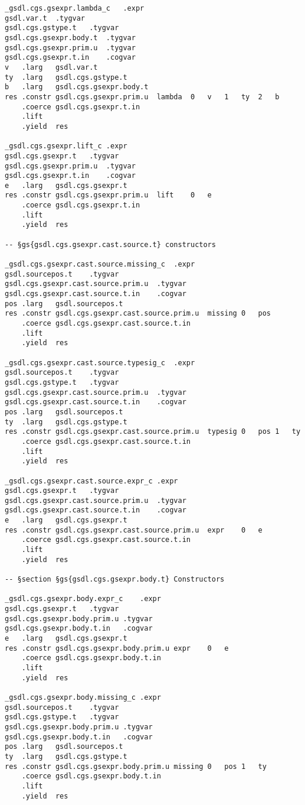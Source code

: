 \documentclass{report}
\begin{document}
\begin{verbatim}
_gsdl.cgs.gsexpr.lambda_c	.expr
gsdl.var.t	.tygvar
gsdl.cgs.gstype.t	.tygvar
gsdl.cgs.gsexpr.body.t	.tygvar
gsdl.cgs.gsexpr.prim.u	.tygvar
gsdl.cgs.gsexpr.t.in	.cogvar
v	.larg	gsdl.var.t
ty	.larg	gsdl.cgs.gstype.t
b	.larg	gsdl.cgs.gsexpr.body.t
res	.constr	gsdl.cgs.gsexpr.prim.u	lambda	0	v	1	ty	2	b
	.coerce	gsdl.cgs.gsexpr.t.in
	.lift
	.yield	res

_gsdl.cgs.gsexpr.lift_c	.expr
gsdl.cgs.gsexpr.t	.tygvar
gsdl.cgs.gsexpr.prim.u	.tygvar
gsdl.cgs.gsexpr.t.in	.cogvar
e	.larg	gsdl.cgs.gsexpr.t
res	.constr	gsdl.cgs.gsexpr.prim.u	lift	0	e
	.coerce	gsdl.cgs.gsexpr.t.in
	.lift
	.yield	res

-- §gs{gsdl.cgs.gsexpr.cast.source.t} constructors

_gsdl.cgs.gsexpr.cast.source.missing_c	.expr
gsdl.sourcepos.t	.tygvar
gsdl.cgs.gsexpr.cast.source.prim.u	.tygvar
gsdl.cgs.gsexpr.cast.source.t.in	.cogvar
pos	.larg	gsdl.sourcepos.t
res	.constr	gsdl.cgs.gsexpr.cast.source.prim.u	missing	0	pos
	.coerce	gsdl.cgs.gsexpr.cast.source.t.in
	.lift
	.yield	res

_gsdl.cgs.gsexpr.cast.source.typesig_c	.expr
gsdl.sourcepos.t	.tygvar
gsdl.cgs.gstype.t	.tygvar
gsdl.cgs.gsexpr.cast.source.prim.u	.tygvar
gsdl.cgs.gsexpr.cast.source.t.in	.cogvar
pos	.larg	gsdl.sourcepos.t
ty	.larg	gsdl.cgs.gstype.t
res	.constr	gsdl.cgs.gsexpr.cast.source.prim.u	typesig	0	pos	1	ty
	.coerce	gsdl.cgs.gsexpr.cast.source.t.in
	.lift
	.yield	res

_gsdl.cgs.gsexpr.cast.source.expr_c	.expr
gsdl.cgs.gsexpr.t	.tygvar
gsdl.cgs.gsexpr.cast.source.prim.u	.tygvar
gsdl.cgs.gsexpr.cast.source.t.in	.cogvar
e	.larg	gsdl.cgs.gsexpr.t
res	.constr	gsdl.cgs.gsexpr.cast.source.prim.u	expr	0	e
	.coerce	gsdl.cgs.gsexpr.cast.source.t.in
	.lift
	.yield	res

-- §section §gs{gsdl.cgs.gsexpr.body.t} Constructors

_gsdl.cgs.gsexpr.body.expr_c	.expr
gsdl.cgs.gsexpr.t	.tygvar
gsdl.cgs.gsexpr.body.prim.u	.tygvar
gsdl.cgs.gsexpr.body.t.in	.cogvar
e	.larg	gsdl.cgs.gsexpr.t
res	.constr	gsdl.cgs.gsexpr.body.prim.u	expr	0	e
	.coerce	gsdl.cgs.gsexpr.body.t.in
	.lift
	.yield	res

_gsdl.cgs.gsexpr.body.missing_c	.expr
gsdl.sourcepos.t	.tygvar
gsdl.cgs.gstype.t	.tygvar
gsdl.cgs.gsexpr.body.prim.u	.tygvar
gsdl.cgs.gsexpr.body.t.in	.cogvar
pos	.larg	gsdl.sourcepos.t
ty	.larg	gsdl.cgs.gstype.t
res	.constr	gsdl.cgs.gsexpr.body.prim.u	missing	0	pos	1	ty
	.coerce	gsdl.cgs.gsexpr.body.t.in
	.lift
	.yield	res


\end{verbatim}
\end{document}
